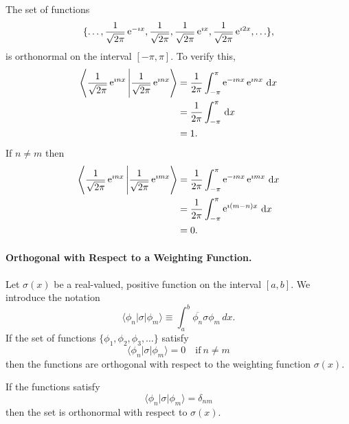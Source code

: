 \begin{Example}
  The set of functions
  \[ \{ \ldots, \frac{1}{\sqrt{2\pi}} \mathop{\mathrm{e}}\nolimits^{-\imath x}, \frac{1}{\sqrt{2\pi}}, 
  \frac{1}{\sqrt{2\pi}} \mathop{\mathrm{e}}\nolimits^{\imath x}, \frac{1}{\sqrt{2\pi}} \mathop{\mathrm{e}}\nolimits^{\imath 2 x},
  \ldots \}, \]
  is orthonormal on the interval $[-\pi, \pi]$.
  To verify this,
  \begin{align*}
    \left\langle \frac{1}{\sqrt{2\pi}} \mathop{\mathrm{e}}\nolimits^{\imath n x} \Bigg| \frac{1}{\sqrt{2\pi}}
      \mathop{\mathrm{e}}\nolimits^{\imath n x} \right\rangle
    &= \frac{1}{2\pi} \int_{-\pi}^\pi \mathop{\mathrm{e}}\nolimits^{-\imath n x} \mathop{\mathrm{e}}\nolimits^{\imath n x}\,\mathrm{d} x \\
    &= \frac{1}{2\pi} \int_{-\pi}^\pi \,\mathrm{d} x \\
    &= 1.
  \end{align*}
  If $n \neq m$ then
  \begin{align*}
    \left\langle \frac{1}{\sqrt{2\pi}} \mathop{\mathrm{e}}\nolimits^{\imath n x} \Bigg| \frac{1}{\sqrt{2\pi}}
      \mathop{\mathrm{e}}\nolimits^{\imath m x} \right\rangle
    &= \frac{1}{2\pi} \int_{-\pi}^\pi \mathop{\mathrm{e}}\nolimits^{-\imath n x} \mathop{\mathrm{e}}\nolimits^{\imath m x}\,\mathrm{d} x \\
    &= \frac{1}{2\pi} \int_{-\pi}^\pi \mathop{\mathrm{e}}\nolimits^{\imath (m - n) x}\,\mathrm{d} x \\
    &= 0.
  \end{align*} 
\end{Example}














\paragraph{Orthogonal with Respect to a Weighting Function.}

Let $\sigma(x)$ be a real-valued, positive function on the 
interval $[a,b]$.  We introduce the notation
\[ \langle \phi_n | \sigma | \phi_m \rangle \equiv \int_a^b \overline{\phi_n}
\sigma \phi_m\, d x.\]
If the set of functions $\{\phi_1, \phi_2, \phi_3, \ldots\}$ satisfy 
\[ \langle \phi_n | \sigma | \phi_m \rangle = 0 \quad \mathrm{if}\ n \neq m \]
then the functions are orthogonal with respect to the weighting function
$\sigma(x)$. 

If the functions satisfy
\[ \langle \phi_n | \sigma | \phi_m \rangle = \delta_{nm} \]
then the set is orthonormal with respect to $\sigma(x)$.



